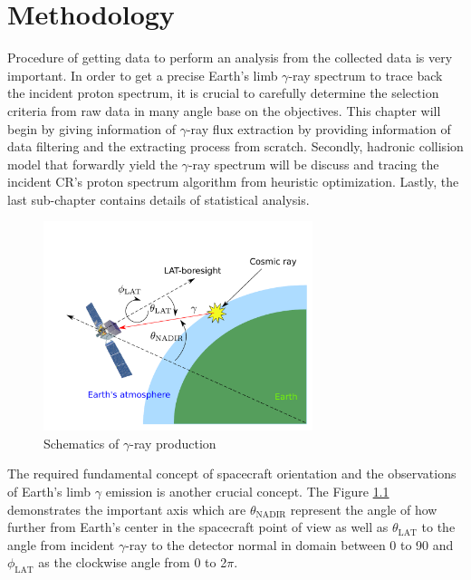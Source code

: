 \chapter{Methodology}

Procedure of getting data to perform an analysis
from the collected data is very important. In order 
to get a precise Earth's limb $\gamma$-ray spectrum to
trace back the incident proton spectrum, it is crucial 
to carefully determine the selection criteria from raw 
data in many angle base on the objectives. This chapter 
will begin by giving information of $\gamma$-ray flux extraction 
by providing information of data filtering and 
the extracting process from scratch. Secondly, hadronic collision 
model that forwardly yield the $\gamma$-ray spectrum 
will be discuss and tracing the incident CR's proton 
spectrum algorithm from heuristic optimization. Lastly,
the last sub-chapter contains details of statistical analysis.

\begin{figure}[h]
    \centering
    \includegraphics[width=0.7\textwidth]{content/methodology/figures/gamma_production_schematic}
    \caption{Schematics of $\gamma$-ray production}
    \label{fig:gamma_emis_sp}
\end{figure}

The required fundamental concept of spacecraft orientation and 
the observations of Earth's limb $\gamma$ emission is another crucial
concept. The Figure \ref{fig:gamma_emis_sp} demonstrates the important
axis which are $\theta_\text{NADIR}$ represent the angle of how further
from Earth's center in the spacecraft point of view as well as 
$\theta_\text{LAT}$ to the angle from incident $\gamma$-ray to the 
detector normal in domain between 0 to 90\textdegree
and $\phi_\text{LAT}$ as the clockwise angle from 0 to 2$\pi$.


